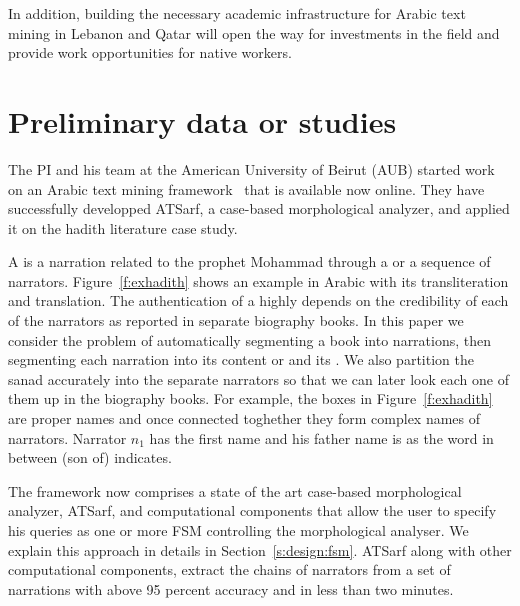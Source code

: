 \documentclass[12pt]{article}
\newcommand{\noArRL}[1]{\arabfalse\RL{#1}\arabtrue}
\newcommand{\noTrRL}[1]{\transfalse\RL{#1}\transtrue}
\begin{document}
In addition, building the necessary academic 
infrastructure for Arabic text mining in Lebanon and Qatar will 
open the way for investments in the field and provide work 
opportunities for native workers.

\pagebreak

\section{Preliminary data or studies}
\label{s:prelim}

The PI and his team at the American University of Beirut (AUB)
started work on an Arabic text mining framework~\cite{ATMine09}
that is available now online.
They have successfully developped ATSarf, a case-based morphological 
analyzer, and applied it on the hadith literature case study. 

A  is a narration related to the prophet Mohammad
through a  or a sequence of narrators. 
Figure~\ref{f:exhadith} shows an example \noArRL{.hady_t} in Arabic with its 
transliteration and translation. 
The authentication of a \noArRL{.hady_t} highly depends on the credibility
of each of the narrators as reported in separate biography 
books. 
In this paper we consider the problem of automatically segmenting
a \noArRL{.hady_t} book into narrations, then segmenting each 
narration into
its content or  and its \noArRL{sanad}.
We also partition the sanad accurately into the 
separate narrators so that we can later look each one of them 
up in the biography books. 
For example, the boxes in Figure~\ref{f:exhadith} are proper names 
and once
connected toghether they form complex names of narrators. 
Narrator $n_1$ has the first name \noTrRL{qtybT} and his father 
name is \noTrRL{s`yd} as the word in between 
\noTrRL{bn} (son of) indicates. 

\transfalse
\begin{figure}[tb]
\end{figure}
\transtrue

The framework now comprises a state of the art
case-based morphological analyzer, ATSarf, 
and computational components that allow the user to
specify his queries as one or more FSM
controlling the morphological analyser.
We explain this approach in details in Section~\ref{s:design:fsm}.
ATSarf along with other computational components, 
extract the chains of narrators from a set of narrations
with above 95 percent accuracy and in less than two minutes. 
\end{document}
